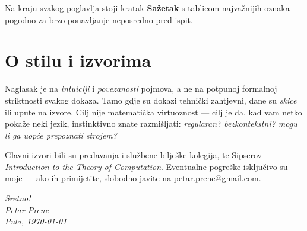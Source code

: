 \documentclass[12pt,a4paper]{report}
\begin{document}
\medskip
\noindent
Na kraju svakog poglavlja stoji kratak \textbf{Sažetak} s tablicom
najvažnijih oznaka --- pogodno za brzo ponavljanje neposredno pred
ispit.

\section*{O stilu i izvorima}

Naglasak je na \emph{intuiciji} i \emph{povezanosti} pojmova, a ne na
potpunoj formalnoj striktnosti svakog dokaza. Tamo gdje su dokazi
tehnički zahtjevni, dane su \emph{skice} ili upute na izvore. Cilj
nije matematička virtuoznost --- cilj je da, kad vam netko pokaže
neki jezik, instinktivno znate razmišljati: \emph{regularan?
bezkontekstni? mogu li ga uopće prepoznati strojem?}

Glavni izvori bili su predavanja i službene bilješke kolegija, te
Sipserov \emph{Introduction to the Theory of Computation}.
Eventualne pogreške isključivo su moje --- ako ih primijetite,
slobodno javite na
\href{mailto:petar.prenc@gmail.com}{petar.prenc@gmail.com}.

\vspace{1.5em}
\begin{flushright}
\itshape Sretno!\\[0.3em]
Petar Prenc\\
Pula, \today
\end{flushright}

\cleardoublepage

\tableofcontents
\cleardoublepage









\end{document}
